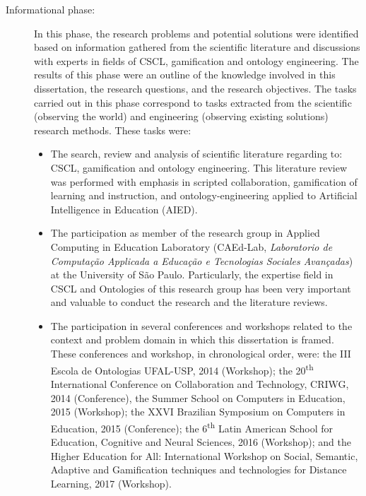 \begin{description}
\item[Informational phase:]
In this phase, the research problems and potential solutions were identified based on information gathered from the scientific literature and discussions with experts in fields of CSCL, gamification and ontology engineering. The results of this phase were an outline of the knowledge involved in this dissertation, the research questions, and the research objectives. The tasks carried out in this phase correspond to tasks extracted from the scientific (observing the world) and engineering (observing existing solutions) research methods. These tasks were:

\begin{itemize}
\item
The search, review and analysis of scientific literature regarding to: CSCL, gamification and ontology engineering. This literature review was performed with emphasis in scripted collaboration, gamification of learning and instruction, and ontology-engineering applied to Artificial Intelligence in Education (AIED).

\item
The participation as member of the research group in Applied Computing in Education Laboratory (CAEd-Lab, \emph{Laboratorio de Computação Applicada a Educação e Tecnologias Sociales Avançadas}) at the University of São Paulo. Particularly, the expertise field in CSCL and Ontologies of this research group has been very important and valuable to conduct the research and the literature reviews.

\item
The participation in several conferences and workshops related to the context and problem domain in which this dissertation is framed. These conferences and workshop, in chronological order, were: the III Escola de Ontologias UFAL-USP, 2014 (Workshop); the 20\textsuperscript{th} International Conference on Collaboration and Technology, CRIWG, 2014 (Conference), the Summer School on Computers in Education, 2015 (Workshop); the XXVI Brazilian Symposium on Computers in Education, 2015 (Conference); the 6\textsuperscript{th} Latin American School for Education, Cognitive and Neural Sciences, 2016 (Workshop); and the Higher Education for All: International Workshop on Social, Semantic, Adaptive and Gamification techniques and technologies for Distance Learning, 2017 (Workshop).


\end{itemize}
\end{description}
